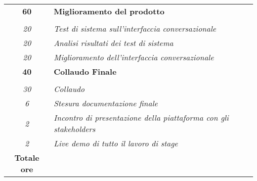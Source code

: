 \begin{tabularx}{\textwidth}{|c|X|}
    \textbf{60} & \textbf{Miglioramento del prodotto} \\	\hdashline
    \multirow{3}{0cm}\\ 
    \textit{20} & 
    \textit{Test di sistema sull'interfaccia conversazionale} \\
    \textit{20} & 
    \textit{Analisi risultati dei test di sistema} \\
    \textit{20} & 
    \textit{Miglioramento dell'interfaccia conversazionale } \\
    \hline
    
    \textbf{40} & \textbf{Collaudo Finale}  \\ \hdashline 
    \multirow{4}{0cm}\\ 
    \textit{30} & 
    \textit{Collaudo} \\
    \textit{6} & 
    \textit{Stesura documentazione finale} \\
    \textit{2} & 
    \textit{Incontro di presentazione della piattaforma con gli stakeholders} \\
    \textit{2} & 
    \textit{Live demo di tutto il lavoro di stage} \\
    \hline
	
	\textbf{Totale ore} & \multicolumn{1}{|c|}{\textbf{\totaleOre}} \\\hline
	
	
\end{tabularx}